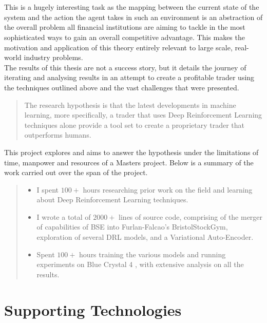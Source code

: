 \documentclass[ %
                    author={Ashwinder Khurana},
                supervisor={Prof Dave Cliff},
                    degree={MEng},
                     title={The Deeply Reinforced Trader},
                  subtitle={},
                      type={enterprise},
                      year={2020} ]{dissertation}
\begin{document}
\\
\\
This is a hugely interesting task as the mapping between the current state of the system and the action the agent takes in such an environment is an abstraction of the overall problem all financial institutions are aiming to tackle in the most sophisticated ways to gain an overall competitive advantage. This makes the motivation and application of this theory entirely relevant to large scale, real-world industry problems. 
\\
The results of this thesis are not a success story, but it details the journey of iterating and analysing results in an attempt to create a profitable trader using the techniques outlined above and the vast challenges that were presented.   

\begin{quote}
The research hypothesis is that the latest developments in machine learning, more specifically, a trader that uses Deep Reinforcement Learning techniques alone provide a tool set to create a proprietary trader that outperforms humans.  
\end{quote}


\noindent
This project explores and aims to answer the hypothesis under the limitations of time, manpower and resources of a Masters project. Below is a summary of the work carried out over the span of the project.
\begin{quote}
\noindent
\begin{itemize}
\item I spent $100+$ hours researching prior work on the field and learning about Deep Reinforcement Learning techniques. 
\item I wrote a total of $2000+$ lines of source code, comprising of the merger of capabilities of BSE into Furlan-Falcao's BristolStockGym, exploration of several DRL models, and a Variational Auto-Encoder. 
\item Spent $100+$ hours training the various models and running experiments on Blue Crystal 4 \cite{BC4}, with extensive analysis on all the results. 
\end{itemize}
\end{quote}


\chapter*{Supporting Technologies}
\end{document}
